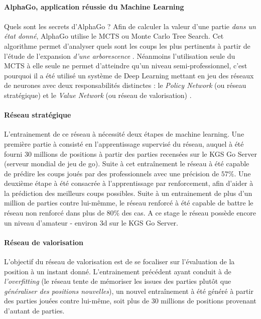 \paragraph{AlphaGo, application réussie du Machine Learning}

\paragraph{} Quels sont les secrets d'AlphaGo ? Afin de calculer la valeur 
d'une partie \emph{dans un état donné}, AlphaGo utilise le MCTS ou Monte Carlo Tree Search. Cet algorithme permet d'analyser
quels sont les coups les plus pertinents à partir de l'étude de l'expansion \emph{d'une arborescence} \cite{Heuristics0}.
Néanmoins l'utilisation seule du MCTS à elle seule ne permet d'atteindre qu'un niveau semi-professionnel, c'est pourquoi il a été
utilisé un système de Deep Learning mettant en jeu des réseaux de neurones avec deux responsabilités distinctes : le
\emph{Policy Network} (ou réseau stratégique) et le \emph{Value Network} (ou réseau de valorisation) \cite{AlphaGo0}.

\paragraph{Réseau stratégique} L'entrainement de ce réseau à nécessité deux étapes de machine learning. Une première partie à 
consisté en l'apprentissage supervisé du réseau, auquel à été fourni 30 millions de positions à partir des parties recensées sur 
le KGS Go Server (serveur mondial de jeu de go). Suite à cet entraînement le réseau à été capable de prédire les coups joués par 
des professionnels avec une précision de \begin{math}57\%\end{math}. Une deuxième étape à été consacrée à l'apprentissage par renforcement, afin d'aider
à la prédiction des meilleurs coups possibles. Suite à un entrainement de plus d'un million de parties contre lui-mêmme, le réseau
renforcé à été capable de battre le réseau non renforcé dans plus de \begin{math}80\%\end{math} des cas. A ce stage le réseau possède encore un niveau
d'amateur - environ 3d sur le KGS Go Server. \cite{AlphaGo1}

\paragraph{Réseau de valorisation} L'objectif du réseau de valorisation est de se focaliser sur l'évaluation de la position à un
instant donné. L'entrainement précédent ayant conduit à de \emph{l'overfitting} (le réseau tente de mémoriser les issues des parties
plutôt que \emph{généraliser des positions nouvelles}), un nouvel entraînement à été généré à partir des parties jouées contre
lui-même, soit plus de 30 millions de positions provenant d'autant de parties.

